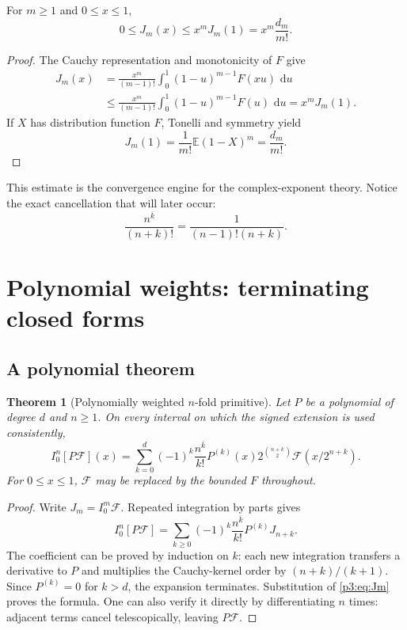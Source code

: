 \documentclass[11pt,oneside]{article}
\newtheorem{theorem}{Theorem}[section]
\theoremstyle{definition}
\theoremstyle{remark}
\newcommand{\E}{\mathbb E}
\newcommand{\dd}{\,\mathrm d}
\newcommand{\rise}[2]{#1^{\overline{#2}}}
\newcommand{\1}{\mathbf 1}
\begin{document}
\begin{lemma}
\label{p3:lem:J-bound}
For $m\ge1$ and $0\le x\le1$,
\begin{equation}
 0\le J_m(x)\le x^mJ_m(1)=x^m\frac{d_m}{m!}.                 \label{p3:eq:J-bound}
\end{equation}
\end{lemma}

\begin{proof}
The Cauchy representation and monotonicity of $F$ give
\begin{align*}
 J_m(x)
 &=\frac{x^m}{(m-1)!}\int_0^1(1-u)^{m-1}F(xu)\,\dd u\\
 &\le\frac{x^m}{(m-1)!}\int_0^1(1-u)^{m-1}F(u)\,\dd u=x^mJ_m(1).
\end{align*}
If $X$ has distribution function $F$, Tonelli and symmetry yield
\[
 J_m(1)=\frac1{m!}\E(1-X)^m=\frac{d_m}{m!}.
\]
\end{proof}

This estimate is the convergence engine for the complex-exponent theory.  Notice the exact
cancellation that will later occur:
\begin{equation}
 \frac{\rise nk}{(n+k)!}=\frac1{(n-1)!(n+k)}.                 \label{p3:eq:rising-cancel}
\end{equation}

\section{Polynomial weights: terminating closed forms}
\label{p3:sec:polynomial}

\subsection{A polynomial theorem}

\begin{theorem}[Polynomially weighted $n$-fold primitive]
\label{p3:thm:poly-primitive}
Let $P$ be a polynomial of degree $d$ and $n\ge1$.  On every interval on which the signed
extension is used consistently,
\begin{equation}
 \boxed{
 I_0^n[P\mathcal F](x)
 =\sum_{k=0}^{d}(-1)^k\frac{\rise nk}{k!}P^{(k)}(x)
 2^{\binom{n+k}{2}}\mathcal F(x/2^{n+k}).}
 \label{p3:eq:poly-primitive}
\end{equation}
For $0\le x\le1$, $\mathcal F$ may be replaced by the bounded $F$ throughout.
\end{theorem}

\begin{proof}
Write $J_m=I_0^m\mathcal F$.  Repeated integration by parts gives
\[
 I_0^n[P\mathcal F]
 =\sum_{k\ge0}(-1)^k\frac{\rise nk}{k!}P^{(k)}J_{n+k}.
\]
The coefficient can be proved by induction on $k$: each new integration transfers a
derivative to $P$ and multiplies the Cauchy-kernel order by $(n+k)/(k+1)$.  Since
$P^{(k)}=0$ for $k>d$, the expansion terminates.  Substitution of \eqref{p3:eq:Jm} proves the
formula.  One can also verify it directly by differentiating $n$ times: adjacent terms
cancel telescopically, leaving $P\mathcal F$.
\end{proof}
\end{document}
